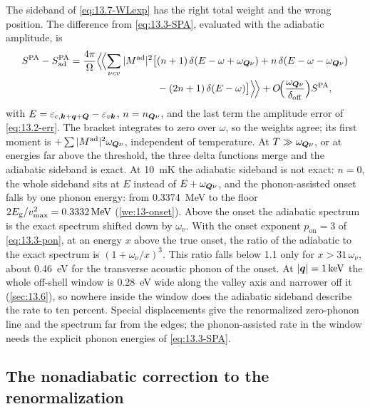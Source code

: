 The sideband of \cref{eq:13.7-WLexp} has the right total weight and the wrong position. The difference from \cref{eq:13.3-SPA}, evaluated with the adiabatic amplitude, is
\begin{equation}
  \begin{aligned}
  S^{\mathrm{PA}} - S^{\mathrm{PA}}_{\mathrm{ad}} = \frac{4\pi}{\Omega}\Bigl\langle\!\Bigl\langle\sum_{\nu cv}|M^{\mathrm{ad}}|^2\bigl[&(n + 1)\,\delta(E - \omega + \omega_{\bm{Q}\nu}) + n\,\delta(E - \omega - \omega_{\bm{Q}\nu}) \\
  &- (2n + 1)\,\delta(E - \omega)\bigr]\Bigr\rangle\!\Bigr\rangle + O\!\Bigl(\frac{\omega_{\bm{Q}\nu}}{\delta_{\mathrm{off}}}\Bigr)S^{\mathrm{PA}} ,
  \end{aligned}
  \label{eq:13.7-WLdiff}
\end{equation}
with $E = \varepsilon_{c,\bm{k}+\bm{q}+\bm{Q}} - \varepsilon_{v\bm{k}}$, $n = n_{\bm{Q}\nu}$, and the last term the amplitude error of \cref{eq:13.2-err}. The bracket integrates to zero over $\omega$, so the weights agree; its first moment is $+\sum|M^{\mathrm{ad}}|^2\omega_{\bm{Q}\nu}$, independent of temperature. At $T \gg \omega_{\bm{Q}\nu}$, or at energies far above the threshold, the three delta functions merge and the adiabatic sideband is exact. At \SI{10}{mK} the adiabatic sideband is not exact: $n = 0$, the whole sideband sits at $E$ instead of $E + \omega_{\bm{Q}\nu}$, and the phonon-assisted onset falls by one phonon energy: from \SI{0.3374}{MeV} to the floor $2E_{\mathrm{g}}/v_{\mathrm{max}}^2 = \SI{0.3332}{MeV}$ (\cref{we:13-onset}). Above the onset the adiabatic spectrum is the exact spectrum shifted down by $\omega_\nu$. With the onset exponent $p_{\mathrm{on}} = 3$ of \cref{eq:13.3-pon}, at an energy $x$ above the true onset, the ratio of the adiabatic to the exact spectrum is $(1 + \omega_\nu/x)^3$. This ratio falls below 1.1 only for $x > 31\,\omega_\nu$, about \SI{0.46}{eV} for the transverse acoustic phonon of the onset. At $|\bm{q}| = \SI{1}{keV}$ the whole off-shell window is \SI{0.28}{eV} wide along the valley axis and narrower off it (\cref{sec:13.6}), so nowhere inside the window does the adiabatic sideband describe the rate to ten percent. Special displacements give the renormalized zero-phonon line and the spectrum far from the edges; the phonon-assisted rate in the window needs the explicit phonon energies of \cref{eq:13.3-SPA}.

\subsection{The nonadiabatic correction to the renormalization}

